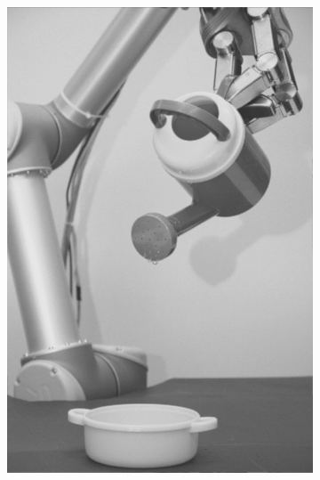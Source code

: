 \begin{figure}[H]
\begin{subfigure}[b]{0.1\textwidth}
        \includegraphics[width=\textwidth]{img3/test/contrast_5_0_9_final_img3.png}
    \end{subfigure}
    \begin{subfigure}[b]{0.1\textwidth}

\end{subfigure}
\end{figure}
